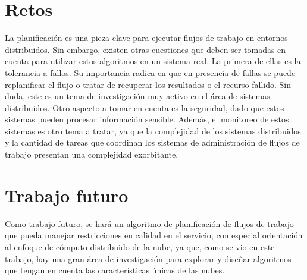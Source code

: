 \section{Retos}
La planificación es una pieza clave para ejecutar flujos de trabajo en entornos distribuidos. Sin embargo, existen otras cuestiones que deben ser tomadas en cuenta para utilizar estos algoritmos en un sistema real. La primera de ellas es la tolerancia a fallos. Su importancia radica en que en presencia de fallas se puede replanificar el flujo o tratar de recuperar los resultados o el recurso fallido. Sin duda, este es un tema de investigación muy activo en el área de sistemas distribuidos. Otro aspecto a tomar en cuenta es la seguridad, dado que estos sistemas pueden procesar información sensible. Además, el monitoreo de estos sistemas es otro tema a tratar, ya que la complejidad de los sistemas distribuidos y la cantidad de tareas que coordinan los sistemas de administración de flujos de trabajo presentan una complejidad exorbitante.

\section{Trabajo futuro}
Como trabajo futuro, se hará un algoritmo de planificación de flujos de trabajo que pueda manejar restricciones en calidad en el servicio, con especial orientación al enfoque de cómputo distribuido de la nube, ya que, como se vio en este trabajo, hay una gran área de investigación para explorar y diseñar algoritmos que tengan en cuenta las características únicas de las nubes.